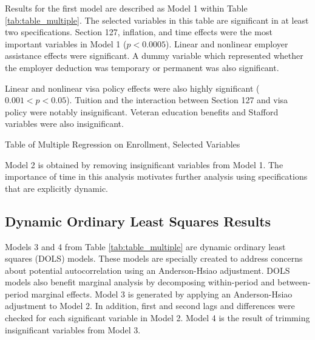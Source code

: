 \documentclass[review]{elsarticle}
\begin{document}
Results for the first model are described as Model 1 within Table \ref{tab:table_multiple}.
The selected variables in this table are significant in at least two specifications.
Section 127, inflation, and time effects were the most important variables in Model 1 ($p < 0.0005$).
Linear and nonlinear employer assistance effects were significant.
A dummy variable which represented whether the employer deduction was temporary or permanent was also significant.

Linear and nonlinear visa policy effects were also highly significant ($0.001 < p < 0.05$).
Tuition and the interaction between Section 127 and visa policy were notably insignificant.
Veteran education benefits and Stafford variables were also insignificant.

\begin{table}
    \caption{Table of Multiple Regression on Enrollment, Selected Variables}
    \resizebox{\columnwidth}{!}{
        
    }
    \label{tab:table_multiple}
\end{table}

Model 2 is obtained by removing insignificant variables from Model 1.
The importance of time in this analysis motivates further analysis using specifications that are explicitly dynamic.

\subsection{Dynamic Ordinary Least Squares Results}

Models 3 and 4 from Table \ref{tab:table_multiple} are dynamic ordinary least squares (DOLS) models.
These models are specially created to address concerns about potential autocorrelation using an Anderson-Hsiao adjustment\cite{anderson1981estimation}.
DOLS models also benefit marginal analysis by decomposing within-period and between-period marginal effects.
Model 3 is generated by applying an Anderson-Hsiao adjustment to Model 2.
In addition, first and second lags and differences were checked for each significant variable in Model 2.
Model 4 is the result of trimming insignificant variables from Model 3.
\end{document}
